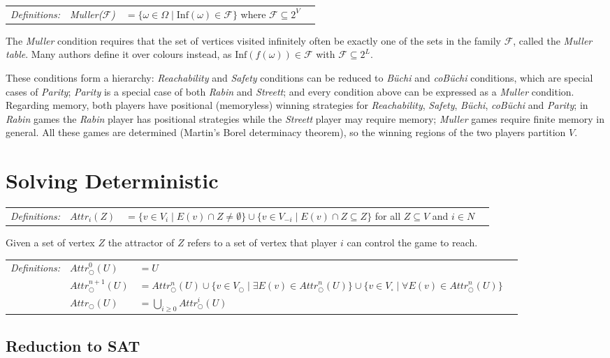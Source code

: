 \documentclass[12pt]{extarticle}
\newcommand{\definition}[1] {
    \begin{tcolorbox}[colback=mygray,colframe=mygray,sharp corners=all,top=0.01cm,bottom=0.01cm,left=0.1cm]
    \small
    \setlength{\tabcolsep}{2pt}
    \begin{tabular}{l l l l}
        \textit{Definitions:} & #1
    \end{tabular}
    \end{tcolorbox}
}
\begin{document}
\definition{
    \textit{Muller($\mathcal{F}$)} &$ =  \{\omega \in \Omega \mid \mathrm{Inf}(\omega) \in \mathcal{F}\}$ where $\mathcal{F} \subseteq 2^V$ 
}
The \textit{Muller} condition requires that the set of vertices visited infinitely often be exactly one of the sets in the family $\mathcal{F}$, called the \textit{Muller table}. Many authors define it over colours instead, as $\mathrm{Inf}(f(\omega)) \in \mathcal{F}$ with $\mathcal{F} \subseteq 2^L$.

These conditions form a hierarchy: \textit{Reachability} and \textit{Safety} conditions can be reduced to \textit{B\"uchi} and \textit{coB\"uchi} conditions, which are special cases of \textit{Parity}; \textit{Parity} is a special case of both \textit{Rabin} and \textit{Streett}; and every condition above can be expressed as a \textit{Muller} condition. Regarding memory, both players have positional (memoryless) winning strategies for \textit{Reachability}, \textit{Safety}, \textit{B\"uchi}, \textit{coB\"uchi} and \textit{Parity}; in \textit{Rabin} games the \textit{Rabin} player has positional strategies while the \textit{Streett} player may require memory; \textit{Muller} games require finite memory in general. All these games are determined (Martin's Borel determinacy theorem), so the winning regions of the two players partition $V$.

\section{Solving Deterministic \wregulargames}

\definition{
    \textit{$Attr_i(Z)$} &$ =  \{v \in V_i \mid E(v) \cap Z \ne \emptyset\} \cup \{v \in V_{-i} \mid E(v) \cap Z \subseteq Z \}$ for all $Z \subseteq V$ and $i \in N$
}

Given a set of vertex $Z$ the attractor of $Z$ refers to a set of vertex that player $i$ can control the game to reach.

\definition{
    $\textit{Attr}^0_\bigcirc(U)$ &$ = U$ 
    \\ & $\textit{Attr}^{n+1}_\bigcirc(U)$ &$ = Attr^n_\bigcirc(U) \cup \{v \in V_\bigcirc \mid \exists E(v) \in \textit{Attr}^n_\bigcirc(U)\} \cup \{v \in V_\square  \mid \forall E(v) \in \textit{Attr}^n_\bigcirc(U)\}$ 
    \\ & $\textit{Attr}_\bigcirc(U)$ &$ = \bigcup_{i \geqslant 0} \textit{Attr}^i_\bigcirc(U)$
}

\subsection{Reduction to SAT}
\end{document}

